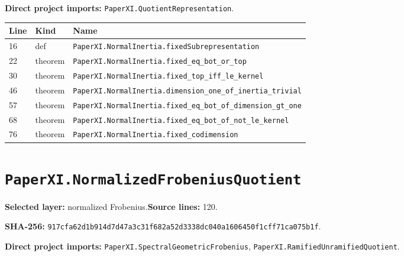 \documentclass[10pt,oneside]{book}
\begin{document}
\textbf{Direct project imports:} \nolinkurl{PaperXI.QuotientRepresentation}.

\begin{longtable}{@{}p{}p{}p{}@{}}\toprule Line&Kind&Name\\\midrule\endhead

16&def&\nolinkurl{PaperXI.NormalInertia.fixedSubrepresentation}\\

22&theorem&\nolinkurl{PaperXI.NormalInertia.fixed_eq_bot_or_top}\\

30&theorem&\nolinkurl{PaperXI.NormalInertia.fixed_top_iff_le_kernel}\\

46&theorem&\nolinkurl{PaperXI.NormalInertia.dimension_one_of_inertia_trivial}\\

57&theorem&\nolinkurl{PaperXI.NormalInertia.fixed_eq_bot_of_dimension_gt_one}\\

68&theorem&\nolinkurl{PaperXI.NormalInertia.fixed_eq_bot_of_not_le_kernel}\\

76&theorem&\nolinkurl{PaperXI.NormalInertia.fixed_codimension}\\

\bottomrule\end{longtable}

\section{\texorpdfstring{\nolinkurl{PaperXI.NormalizedFrobeniusQuotient}}{PaperXI.NormalizedFrobeniusQuotient}}\label{module:PaperXI.NormalizedFrobeniusQuotient}

\textbf{Selected layer:} normalized Frobenius.\quad\textbf{Source lines:} 120.\par\textbf{SHA-256:} {\scriptsize\nolinkurl{917cfa62d1b914d7d47a3c31f682a52d3338dc040a1606450f1cff71ca075b1f}}.


\textbf{Direct project imports:} \nolinkurl{PaperXI.SpectralGeometricFrobenius}, \nolinkurl{PaperXI.RamifiedUnramifiedQuotient}.
\end{document}
